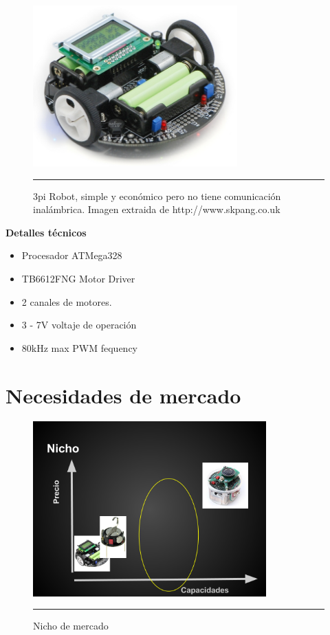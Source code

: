 \begin{figure}[htbp]
	\centering
		\includegraphics[width=0.7\textwidth]{./Figures/3pi.jpg}
		\rule{35em}{0.5pt} 
	\caption[swarm]{3pi Robot, simple y económico pero no tiene comunicación inalámbrica. Imagen extraida de http://www.skpang.co.uk}
	\label{fig:3pi}
\end{figure}

\textbf{Detalles técnicos}
\begin{itemize}
\item Procesador ATMega328
\item TB6612FNG Motor Driver
\item 2 canales de motores.
\item 3 - 7V voltaje de operación
\item 80kHz max PWM fequency
\end{itemize}


\section{Necesidades de mercado}
\begin{figure}[htbp]
	\centering
		\includegraphics[width=0.8\textwidth]{./Figures/nicho.png}
		\rule{35em}{0.5pt}
	\caption[nicho]{Nicho de mercado}
	\label{fig:nicho}
\end{figure}

